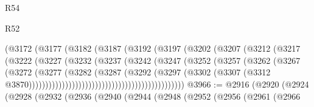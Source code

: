 \begin{lexlean}{R54}
\begin{lexlean}{R52}
\begin{coremodule}
{{{{{{{{{{{{{{{{{{{{{{{{{{{{{{{{{{{{{{{{{{{{{{{{{{{{{{{{{{{{{{{{{{{{{{{{{{{{{{{{{{{{{{{{{{{{{{{{{{{{{{{{{{{{{{{{{{{{{{{{{{{{{{{{{{{{{{{{{{{{{{{{{{{{{{{{{{{{{{{{{{{{{{{{{{{{{{{{{{{{{{{{{{{{{{{{{{{{{{                                        (@3172
                                          (@3177
                                            (@3182
                                              (@3187
                                                (@3192
                                                  (@3197
                                                    (@3202
                                                      (@3207
                                                        (@3212
                                                          (@3217
                                                            (@3222
                                                              (@3227
                                                                (@3232
                                                                  (@3237
                                                                    (@3242
                                                                      (@3247
                                                                        (@3252
                                                                          (@3257
                                                                            (@3262
                                                                              (@3267
                                                                                (@3272
                                                                                  (@3277
                                                                                    (@3282
                                                                                      (@3287
                                                                                        (@3292
                                                                                          (@3297
                                                                                            (@3302
                                                                                              (@3307
                                                                                                (@3312
                                                                                                  @3870)))))))))))))))))))))))))))))))))))))))))))))))
@3966 := @2916
    (@2920
      (@2924
        (@2928
          (@2932
            (@2936
              (@2940
                (@2944
                  (@2948
                    (@2952
                      (@2956
                        (@2961
                          (@2966
}}}}}}}}}}}}}}}}}}}}}}}}}}}}}}}}}}}}}}}}}}}}}}}}}}}}}}}}}}}}}}}}}}}}}}}}}}}}}}}}}}}}}}}}}}}}}}}}}}}}}}}}}}}}}}}}}}}}}}}}}}}}}}}}}}}}}}}}}}}}}}}}}}}}}}}}}}}}}}}}}}}}}}}}}}}}}}}}}}}}}}}}}}}}}}}}}}}}}}
\end{coremodule}
\end{lexlean}
\end{lexlean}
